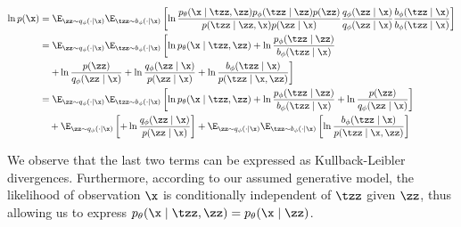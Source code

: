 \begin{equation}
    \begin{split}
        \ln{p(\x)}
        & =
        \E_{\zz \sim q_{\phi}(\cdot \mid \x)} \E_{\tzz \sim  b_{\phi}(\cdot \mid \x)}
        \left[
            \ln
            \frac
            {p_{\theta}(\x \mid \tzz, \zz) p_{\phi}(\tzz \mid \zz) p(\zz)}
            {p(\tzz \mid \zz, \x) p(\zz \mid \x)}
            \frac
            {q_{\phi}(\zz \mid \x)}
            {q_{\phi}(\zz \mid \x)}
            \frac
            {b_{\phi}(\tzz \mid \x)}
            {b_{\phi}(\tzz \mid \x)}
            \right] \\
        & =
        \E_{\zz \sim q_{\phi}(\cdot \mid \x)} \E_{\tzz \sim  b_{\phi}(\cdot \mid \x)}
        \left[
            \ln p_{\theta}(\x \mid \tzz, \zz) +
            \ln \frac{p_{\phi}(\tzz \mid \zz)}{b_{\phi}(\tzz \mid \x)}
            \right. \\
            & \quad
            \left.
            + \ln \frac{p(\zz)}{q_{\phi}(\zz \mid \x)} +
            \ln \frac{q_{\phi}(\zz \mid \x)}{p(\zz \mid \x)} +
            \ln \frac{b_{\phi}(\tzz \mid \x)}{p(\tzz \mid \x, \zz)}
            \right]
        \\
        & =
        \E_{\zz \sim q_{\phi}(\cdot \mid \x)} \E_{\tzz \sim  b_{\phi}(\cdot \mid \x)}
        \left[
            \ln p_{\theta}(\x \mid \tzz, \zz) +
            \ln \frac{p_{\phi}(\tzz \mid \zz)}{b_{\phi}(\tzz \mid \x)} +
            \ln \frac{p(\zz)}{q_{\phi}(\zz \mid \x)}
            \right] \\
        & \quad
        + \E_{\zz \sim q_{\phi}(\cdot \mid \x)}
        \left[
            +
            \ln \frac{q_{\phi}(\zz \mid \x)}{p(\zz \mid \x)}
            \right] +
        \E_{\zz \sim q_{\phi}(\cdot \mid \x)} \E_{\tzz \sim  b_{\phi}(\cdot \mid \x)}
        \left[
            \ln \frac{b_{\phi}(\tzz \mid \x)}{p(\tzz \mid \x, \zz)}
            \right]
        \\
    \end{split}
\end{equation}

We observe that the last two terms can be expressed as
Kullback-Leibler divergences. Furthermore, according to our assumed generative model, the likelihood of observation $\x$ is conditionally independent of $\tzz$ given $\zz$, thus allowing us to express $p_{\theta}(\x \mid \tzz, \zz) = p_{\theta}(\x \mid \zz)$.


